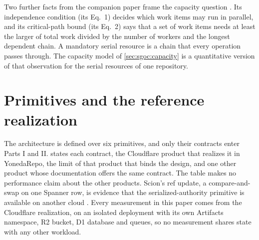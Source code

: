 \documentclass[11pt,letterpaper]{article}
\theoremstyle{definition}
\theoremstyle{remark}
\begin{document}
Two further facts from the companion paper frame the capacity question \cite{long2026inversion}. Its independence condition (its Eq.~1) decides which work items may run in parallel, and its critical-path bound (its Eq.~2) says that a set of work items needs at least the larger of total work divided by the number of workers and the longest dependent chain. A mandatory serial resource is a chain that every operation passes through. The capacity model of \cref{sec:sgoc:capacity} is a quantitative version of that observation for the serial resources of one repository.

\section{Primitives and the reference realization}
\label{sec:sgoc:mapping}

The architecture is defined over six primitives, and only their contracts enter Parts I and II.  states each contract, the Cloudflare product that realizes it in YonedaRepo, the limit of that product that binds the design, and one other product whose documentation offers the same contract. The table makes no performance claim about the other products. Scion's ref update, a compare-and-swap on one Spanner row, is evidence that the serialized-authority primitive is available on another cloud \cite{anthropic2026scion,corbett2012spanner}. Every measurement in this paper comes from the Cloudflare realization, on an isolated deployment with its own Artifacts namespace, R2 bucket, D1 database and queues, so no measurement shares state with any other workload.
\end{document}
